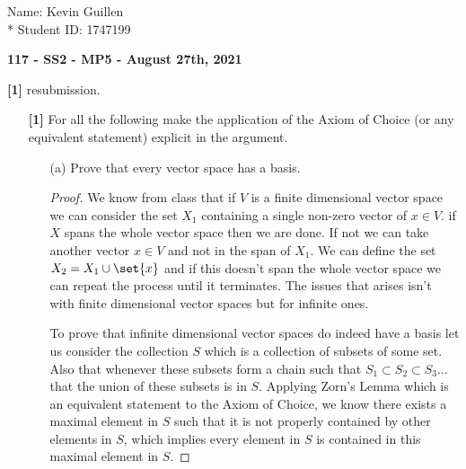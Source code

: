 \documentclass[12pt]{article}
\DeclarePairedDelimiter\set\{\}
\begin{document}
\begin{flushright}
    Name: Kevin Guillen \\*
    Student ID: 1747199
\end{flushright}
\begin{center}
    {\bf 117 - SS2 - MP5 - August 27th, 2021}
\end{center}
\textbf{[1]} resubmission.
\begin{itemize}

    \item[\textbf{[1]}] For all the following make the application of the Axiom of Choice (or any equivalent statement) explicit in the argument.
    \begin{itemize}
        \item[(a)] Prove that every vector space has a basis.
        \begin{proof}
            We know from class that if $V$ is a finite dimensional vector space we can consider the set $X_1$  containing a single non-zero vector of $x\in V$. if $X$ spans the whole vector space then we are done. If not we can take another vector $x\in V$ and not in the span of $X_1$. We can define the set $X_2 = X_1 \cup \set{x} $ and if this doesn't span the whole vector space we can repeat the process until it terminates. The issues that arises isn't with finite dimensional vector spaces but for infinite ones.

            To prove that infinite dimensional vector spaces do indeed have a basis let us consider the collection $S$ which is a collection of subsets of some set. Also that whenever these subsets form a chain such that $S_1 \subset S_2 \subset S_3 \dots$ that the union of these subsets is in $S$. Applying Zorn's Lemma which is an equivalent statement to the Axiom of Choice, we know there exists a maximal element in $S$ such that it is not properly contained by other elements in $S$, which implies every element in $S$ is contained in this maximal element in $S$. 


\end{proof}
\end{itemize}
\end{itemize}
\end{document}
